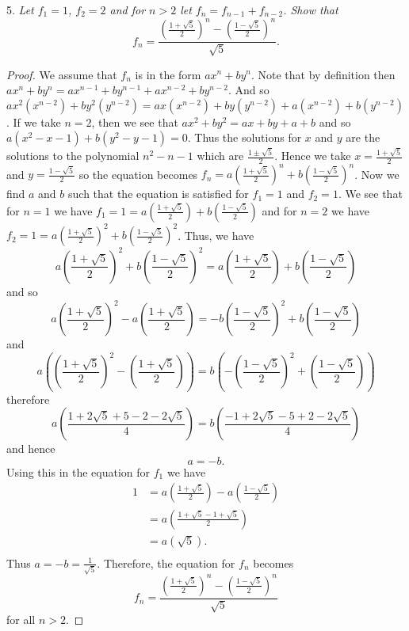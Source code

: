 \documentclass{article}
\begin{document}
\begin{flushleft}
5. \textsl{Let $f_1 = 1$, $f_2=2$ and for $n>2$ let $f_n=f_{n-1}+f_{n-2}$. Show that
\[
f_n = \frac { \left( \frac { 1 + \sqrt{5} } {2} \right)^n - \left( \frac { 1 - \sqrt{5} } {2} \right)^n} { \sqrt{5} }.
\]}
\begin{proof}
We assume that $f_n$ is in the form $ax^n + by^n$. Note that by definition then $ax^{n} + by^{n} = ax^{n-1} + by^{n-1} + ax^{n-2} + by^{n-2}$. And so $ax^2(x^{n-2}) + by^2(y^{n-2}) = ax(x^{n-2}) + by(y^{n-2}) + a(x^{n-2}) + b(y^{n-2})$. If we take $n=2$, then we see that $ax^2+by^2=ax + by + a + b$ and so $a(x^2-x-1) + b(y^2-y-1) = 0$. Thus the solutions for $x$ and $y$ are the solutions to the polynomial $n^2-n-1$ which are $\frac {1 \pm \sqrt{5}} {2}$. Hence we take $x= \frac {1 + \sqrt{5}} {2}$ and $y=\frac{1-\sqrt{5}}{2}$ so the equation becomes $f_n=a \left( \frac {1 + \sqrt{5}} {2} \right)^n + b \left( \frac{1-\sqrt{5}}{2} \right)^n$. Now we find $a$ and $b$ such that the equation is satisfied for $f_1=1$ and $f_2=1$. We see that for $n=1$ we have $f_1=1=a \left( \frac {1 + \sqrt{5}} {2} \right) + b \left( \frac{1-\sqrt{5}}{2} \right)$ and for $n=2$ we have $f_2=1=a \left( \frac {1 + \sqrt{5}} {2} \right)^2 + b \left( \frac{1-\sqrt{5}}{2} \right)^2$. Thus, we have
\[
a\left( \frac {1 + \sqrt{5}} {2} \right)^2 + b \left( \frac{1-\sqrt{5}}{2} \right)^2=a \left( \frac {1 + \sqrt{5}} {2} \right) + b \left( \frac{1-\sqrt{5}}{2} \right)
\]
and so
\[
a\left( \frac {1 + \sqrt{5}} {2} \right)^2 - a \left( \frac {1 + \sqrt{5}} {2} \right) = -b \left( \frac{1-\sqrt{5}}{2} \right)^2 + b \left( \frac{1-\sqrt{5}}{2} \right)
\]
and
\[
a\left( \left(\frac {1 + \sqrt{5}} {2} \right)^2 - \left( \frac {1 + \sqrt{5}} {2} \right) \right) = b \left( -\left( \frac{1-\sqrt{5}}{2} \right)^2 + \left( \frac{1-\sqrt{5}}{2} \right)\right)
\]
therefore
\[
a \left( \frac {1 +2 \sqrt{5} + 5 - 2 - 2\sqrt{5}} {4} \right) = b \left( \frac{ -1 + 2 \sqrt{5} -5 + 2 -2\sqrt{5}}{4}\right)
\]
and hence
\[
a=-b.
\]
Using this in the equation for $f_1$ we have
\begin{align*}
1&=a\left(\frac{1+\sqrt{5}}{2}\right)-a\left(\frac{1-\sqrt{5}}{2}\right)\\
 &=a\left(\frac{1+ \sqrt{5} -1 + \sqrt{5}}{2}\right)\\
 &=a\left(\sqrt{5}\right).\\
\end{align*}
Thus $a=-b=\frac{1}{\sqrt{5}}$. Therefore, the equation for $f_n$ becomes
\[
f_n = \frac { \left( \frac { 1 + \sqrt{5} } {2} \right)^n - \left( \frac { 1 - \sqrt{5} } {2} \right)^n} { \sqrt{5} }
\]
for all $n>2$.
\end{proof}


\end{flushleft}
\end{document}
